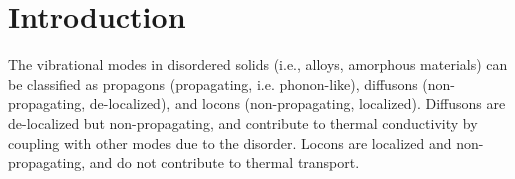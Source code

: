 \documentclass[aps,prb,onecolumn,preprint,superscriptaddress,footinbib,amsmath,amssymb,floatfix]{revtex4}
\begin{document}
\section{\label{S:Introduction}Introduction}


The vibrational modes in disordered solids (i.e., alloys, 
amorphous materials) can be 
classified as propagons (propagating, i.e. phonon-like), 
diffusons (non-propagating, de-localized), and 
locons (non-propagating, localized).
\cite{allen_thermal_1993,allen_diffusons_1999} 
Diffusons are de-localized but non-propagating, 
and contribute to thermal conductivity by coupling 
with other modes due to the disorder. Locons are 
localized and non-propagating, and do not contribute 
to thermal transport. 
\end{document}
